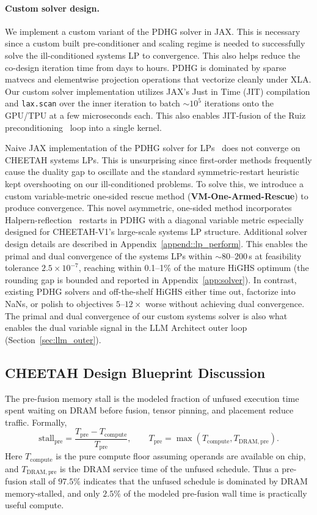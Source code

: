 \paragraph{Custom solver design.}
We implement a custom variant of the PDHG solver in JAX. 
This is necessary since a custom built pre-conditioner and scaling regime is needed to successfully solve the ill-conditioned systems LP to convergence. This also helps reduce the co-design iteration time from days to hours. 
PDHG is dominated by sparse matvecs and elementwise projection operations that vectorize cleanly under XLA. 
Our custom solver implementation utilizes JAX's Just in Time (JIT) compilation and \texttt{lax.scan} over the inner iteration to batch ${\sim}10^5$ iterations onto the GPU/TPU at a few microseconds each. This also enables JIT-fusion of the Ruiz preconditioning~\citep{ruiz2001scaling} loop into a single kernel.

Naive JAX implementation of the PDHG solver for LPs~\citep{applegate2026pdlp} does not converge on CHEETAH systems LPs. 
This is unsurprising since first-order methods frequently cause the duality gap to oscillate and the standard symmetric-restart heuristic kept overshooting on our ill-conditioned problems. 
To solve this, we introduce a custom variable-metric one-sided rescue method (\textbf{VM-One-Armed-Rescue}) to produce convergence.
This novel asymmetric, one-sided method incorporates Halpern-reflection~\citep{halpern1967fixed} restarts in PDHG with a diagonal variable metric especially designed for CHEETAH-V1's large-scale systems LP structure. 
Additional solver design details are described in Appendix~\ref{append::lp_perform}.
This enables the primal and dual convergence of the systems LPs within ${\sim}80$--$200$\,s at feasibility tolerance $2.5\times10^{-7}$, reaching within 0.1--1\% of
the mature HiGHS optimum (the rounding gap is bounded and reported in Appendix~\ref{app:solver}). 
In contrast, existing PDHG solvers and off-the-shelf HiGHS either time out,
factorize into NaNs, or polish to objectives $5$--$12\times$ worse
without achieving dual convergence. 
The primal and dual convergence of our custom systems solver is also what enables the dual variable signal in the LLM Architect outer loop (Section~\ref{sec:llm_outer}).



\subsection{CHEETAH Design Blueprint Discussion}
\label{app:blueprint_tables}
The pre-fusion memory stall is the modeled fraction of unfused execution
time spent waiting on DRAM before fusion, tensor pinning, and placement
reduce traffic. Formally, 
\[
\mathrm{stall}_{\mathrm{pre}}
=
\frac{T_{\mathrm{pre}}-T_{\mathrm{compute}}}{T_{\mathrm{pre}}},
\qquad
T_{\mathrm{pre}}
=
\max(T_{\mathrm{compute}},T_{\mathrm{DRAM,pre}}).
\]
Here \(T_{\mathrm{compute}}\) is the pure compute floor assuming operands
are available on chip, and \(T_{\mathrm{DRAM,pre}}\) is the DRAM service
time of the unfused schedule. Thus a pre-fusion stall of \(97.5\%\)
indicates that the unfused schedule is dominated by  DRAM memory-stalled, and
only \(2.5\%\) of the modeled pre-fusion wall time is practically useful compute.

